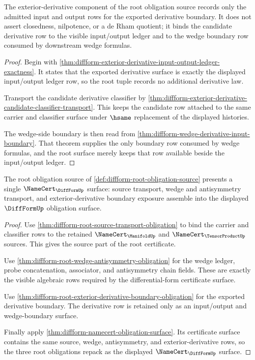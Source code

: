 \begin{theorem}
\label{thm:diffform-root-exterior-derivative-boundary-obligation}
The exterior-derivative component of the root obligation source records only
the admitted input and output rows for the exported derivative boundary. It
does not assert closedness, nilpotence, or a de Rham quotient; it binds the
candidate derivative row to the visible input/output ledger and to the wedge
boundary row consumed by downstream wedge formulas.
\end{theorem}
\begin{proof}
Begin with
\autoref{thm:diffform-exterior-derivative-input-output-ledger-exactness}. It
states that the exported derivative surface is exactly the displayed
input/output ledger row, so the root tuple records no additional derivative
law.

Transport the candidate derivative classifier by
\autoref{thm:diffform-exterior-derivative-candidate-classifier-transport}.
This keeps the candidate row attached to the same carrier and classifier
surface under $\hsame$ replacement of the displayed histories.

The wedge-side boundary is then read from
\autoref{thm:diffform-wedge-derivative-input-boundary}. That theorem supplies
the only boundary row consumed by wedge formulas, and the root surface merely
keeps that row available beside the input/output ledger.
\end{proof}

\begin{theorem}
\label{thm:diffform-root-namecert-surface}
The root obligation source of
\autoref{def:diffform-root-obligation-source} presents a single
$\NameCert_{\DiffFormUp}$ surface: source transport, wedge and antisymmetry
transport, and exterior-derivative boundary exposure assemble into the
displayed $\DiffFormUp$ obligation surface.
\end{theorem}
\begin{proof}
Use \autoref{thm:diffform-root-source-transport-obligation} to bind the
carrier and classifier rows to the retained
$\NameCert_{\ManifoldUp}$ and $\NameCert_{\TensorProductUp}$ sources. This
gives the source part of the root certificate.

Use \autoref{thm:diffform-root-wedge-antisymmetry-obligation} for the wedge
ledger, probe concatenation, associator, and antisymmetry chain fields. These
are exactly the visible algebraic rows required by the differential-form
certificate surface.

Use \autoref{thm:diffform-root-exterior-derivative-boundary-obligation} for
the exported derivative boundary. The derivative row is retained only as an
input/output and wedge-boundary surface.

Finally apply \autoref{thm:diffform-namecert-obligation-surface}. Its
certificate surface contains the same source, wedge, antisymmetry, and
exterior-derivative rows, so the three root obligations repack as the
displayed $\NameCert_{\DiffFormUp}$ surface.
\end{proof}
